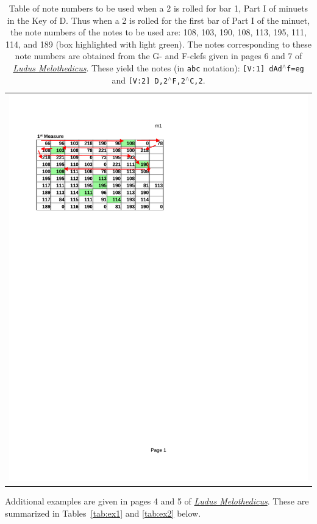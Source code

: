 \documentclass[a4paper,x11names,svgnames,10pt]{article}
\begin{document}
{\begin{table}[H]
	\centering
	\begin{tabular}{c}
		\centering
		\includegraphics[clip=true,trim=0.75in 7.60in 4.00in 1.10in,scale=0.90]{ludus9-D-m1}
	\end{tabular}
	\caption{Table of note numbers to be used when a 2 is rolled for bar 1, Part I of minuets in the Key of D.  Thus when a 2 is rolled for the first bar of Part I of the minuet, the note numbers of the notes to be used are: 108, 103, 190, 108, 113, 195, 111, 114, and 189 (box highlighted with light green). The notes corresponding to these note numbers are obtained from the G- and F-clefs given in pages 6 and 7 of \href{https://imslp.org/wiki/Ludus_Melothedicus_(Anonymous)}{{\em Ludus Melothedicus}}. These yield the notes (in {\tt abc} notation): {\tt [V:1] dAd$^\wedge$f=eg} and {\tt [V:2] D,2$^\wedge$F,2$^\wedge$C,2}.}
	\label{fig:r2m1}
\end{table}

Additional examples are given in pages 4 and 5 of \href{https://imslp.org/wiki/Ludus_Melothedicus_(Anonymous)}{{\em Ludus Melothedicus}}.  These are summarized in Tables~\ref{tab:ex1} and \ref{tab:ex2} below.

}
\end{document}
